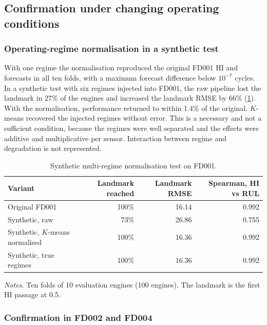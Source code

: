 \documentclass[preprint,12pt]{elsarticle}
\newcommand{\tablenotes}[1]{\par\smallskip\begin{minipage}{\linewidth}\footnotesize\raggedright\setlength{\parindent}{0pt}\setlength{\parskip}{0.35\baselineskip}\textit{Notes.} #1\end{minipage}}
\begin{document}
\subsection{Confirmation under changing operating conditions}


\subsubsection{Operating-regime normalisation in a synthetic test}

With one regime the normalisation reproduced the original FD001 HI and forecasts in all ten folds, with a maximum forecast difference below $10^{-7}$ cycles. In a synthetic test with six regimes injected into FD001, the raw pipeline lost the landmark in 27\% of the engines and increased the landmark RMSE by 66\% (\cref{tab:regime-test}). With the normalisation, performance returned to within 1.4\% of the original. $K$-means recovered the injected regimes without error. This is a necessary and not a sufficient condition, because the regimes were well separated and the effects were additive and multiplicative per sensor. Interaction between regime and degradation is not represented.

\begin{table}[htbp]
\centering
\caption{Synthetic multi-regime normalisation test on FD001.}
\label{tab:regime-test}
\footnotesize
\setlength{\tabcolsep}{3pt}
\begin{tabularx}{\linewidth}{@{}Xrrr@{}}
\toprule
Variant & Landmark reached & Landmark RMSE & Spearman, HI vs RUL \\
\midrule
Original FD001 & 100\% & 16.14 & 0.992 \\
Synthetic, raw & 73\% & 26.86 & 0.755 \\
Synthetic, $K$-means normalised & 100\% & 16.36 & 0.992 \\
Synthetic, true regimes & 100\% & 16.36 & 0.992 \\
\bottomrule
\end{tabularx}
\tablenotes{Ten folds of 10 evaluation engines (100 engines). The landmark is the first HI passage at 0.5.}
\end{table}

\subsubsection{Confirmation in FD002 and FD004}\label{sec:confirmation-results}
\end{document}

